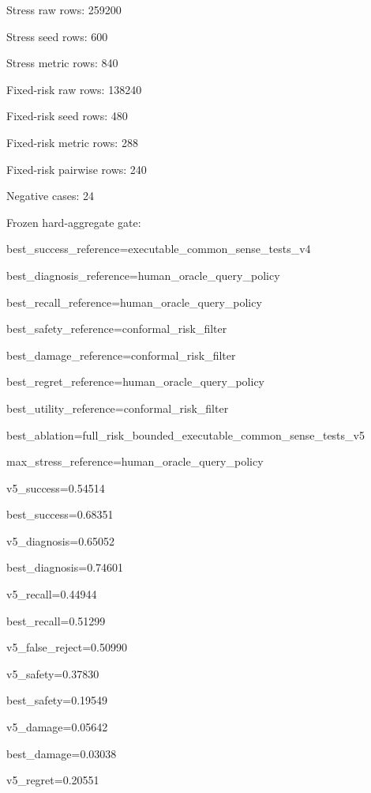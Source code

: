 \documentclass{article}
\begin{document}
\noindent Stress raw rows: 259200\par
\noindent Stress seed rows: 600\par
\noindent Stress metric rows: 840\par
\noindent Fixed-risk raw rows: 138240\par
\noindent Fixed-risk seed rows: 480\par
\noindent Fixed-risk metric rows: 288\par
\noindent Fixed-risk pairwise rows: 240\par
\noindent Negative cases: 24\par
\noindent \par
\noindent Frozen hard-aggregate gate:\par
\noindent best\_success\_reference=executable\_common\_sense\_tests\_v4\par
\noindent best\_diagnosis\_reference=human\_oracle\_query\_policy\par
\noindent best\_recall\_reference=human\_oracle\_query\_policy\par
\noindent best\_safety\_reference=conformal\_risk\_filter\par
\noindent best\_damage\_reference=conformal\_risk\_filter\par
\noindent best\_regret\_reference=human\_oracle\_query\_policy\par
\noindent best\_utility\_reference=conformal\_risk\_filter\par
\noindent best\_ablation=full\_risk\_bounded\_executable\_common\_sense\_tests\_v5\par
\noindent max\_stress\_reference=human\_oracle\_query\_policy\par
\noindent v5\_success=0.54514\par
\noindent best\_success=0.68351\par
\noindent v5\_diagnosis=0.65052\par
\noindent best\_diagnosis=0.74601\par
\noindent v5\_recall=0.44944\par
\noindent best\_recall=0.51299\par
\noindent v5\_false\_reject=0.50990\par
\noindent v5\_safety=0.37830\par
\noindent best\_safety=0.19549\par
\noindent v5\_damage=0.05642\par
\noindent best\_damage=0.03038\par
\noindent v5\_regret=0.20551\par
\end{document}
